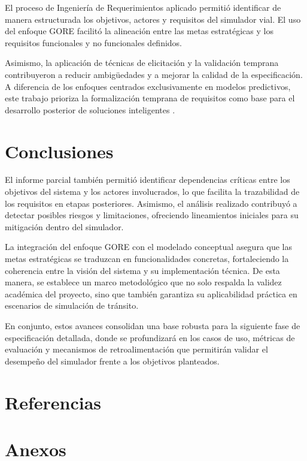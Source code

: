 \documentclass[12pt]{article}
\begin{document}
	El proceso de Ingeniería de Requerimientos aplicado permitió identificar de manera estructurada los objetivos, actores y requisitos del simulador vial. El uso del enfoque GORE facilitó la alineación entre las metas estratégicas y los requisitos funcionales y no funcionales definidos.
	
	Asimismo, la aplicación de técnicas de elicitación y la validación temprana contribuyeron a reducir ambigüedades y a mejorar la calidad de la especificación. A diferencia de los enfoques centrados exclusivamente en modelos predictivos, este trabajo prioriza la formalización temprana de requisitos como base para el desarrollo posterior de soluciones inteligentes \cite{Ferrari2021}.
	
	\newpage
	\section{Conclusiones}
	El informe parcial también permitió identificar dependencias críticas entre los objetivos del sistema y los actores involucrados, lo que facilita la trazabilidad de los requisitos en etapas posteriores. Asimismo, el análisis realizado contribuyó a detectar posibles riesgos y limitaciones, ofreciendo lineamientos iniciales para su mitigación dentro del simulador.
	
	La integración del enfoque GORE con el modelado conceptual asegura que las metas estratégicas se traduzcan en funcionalidades concretas, fortaleciendo la coherencia entre la visión del sistema y su implementación técnica. De esta manera, se establece un marco metodológico que no solo respalda la validez académica del proyecto, sino que también garantiza su aplicabilidad práctica en escenarios de simulación de tránsito.
	
	En conjunto, estos avances consolidan una base robusta para la siguiente fase de especificación detallada, donde se profundizará en los casos de uso, métricas de evaluación y mecanismos de retroalimentación que permitirán validar el desempeño del simulador frente a los objetivos planteados.
	
	\newpage
	\section{Referencias}
	\printbibliography
	
	\newpage
	\section{Anexos}
\end{document}
